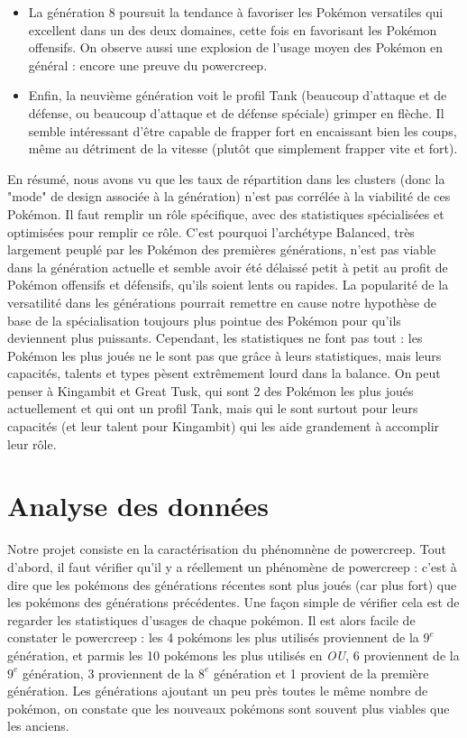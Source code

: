 \documentclass[a4paper,12pt]{article}
\begin{document}
\begin{itemize}
    \item La génération 8 poursuit la tendance à favoriser les Pokémon versatiles qui excellent dans un des deux domaines, cette fois en favorisant les Pokémon offensifs. On observe aussi une explosion de l'usage moyen des Pokémon en général : encore une preuve du powercreep.
    \item Enfin, la neuvième génération voit le profil Tank (beaucoup d'attaque et de défense, ou beaucoup d'attaque et de défense spéciale) grimper en flèche. Il semble intéressant d'être capable de frapper fort en encaissant bien les coups, même au détriment de la vitesse (plutôt que simplement frapper vite et fort).
    
\end{itemize}

En résumé, nous avons vu que les taux de répartition dans les clusters (donc la "mode" de design associée à la génération) n'est pas corrélée à la viabilité de ces Pokémon. Il faut remplir un rôle spécifique, avec des statistiques spécialisées et optimisées pour remplir ce rôle. C'est pourquoi l'archétype Balanced, très largement peuplé par les Pokémon des premières générations, n'est pas viable dans la génération actuelle et semble avoir été délaissé petit à petit au profit de Pokémon offensifs et défensifs, qu'ils soient lents ou rapides. La popularité de la versatilité dans les générations pourrait remettre en cause notre hypothèse de base de la spécialisation toujours plus pointue des Pokémon pour qu'ils deviennent plus puissants. Cependant, les statistiques ne font pas tout : les Pokémon les plus joués ne le sont pas que grâce à leurs statistiques, mais leurs capacités, talents et types pèsent extrêmement lourd dans la balance. On peut penser à Kingambit et Great Tusk, qui sont 2 des Pokémon les plus joués actuellement et qui ont un profil Tank, mais qui le sont surtout pour leurs capacités (et leur talent pour Kingambit) qui les aide grandement à accomplir leur rôle.

\section{Analyse des données}

Notre projet consiste en la caractérisation du phénomnène de powercreep. Tout
d'abord, il faut vérifier qu'il y a réellement un phénomène de powercreep :
c'est à dire que les pokémons des générations récentes sont plus joués (car plus
fort) que les pokémons des générations précédentes. Une façon simple de vérifier
cela est de regarder les statistiques d'usages de chaque pokémon. Il est alors
facile de constater le powercreep : les 4 pokémons les plus utilisés proviennent
de la $9^{e}$ génération, et parmis les 10 pokémons les plus utilisés en
\textit{OU}, 6 proviennent de la $9^{e}$ génération, 3 proviennent de la $8^{e}$
génération et 1 provient de la première génération. Les générations ajoutant un
peu près toutes le même nombre de pokémon, on constate que les nouveaux pokémons
sont souvent plus viables que les anciens.
\end{document}
